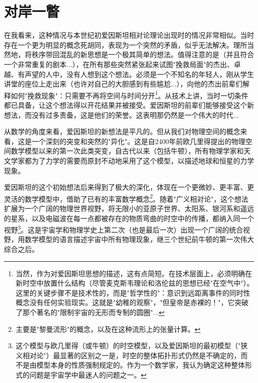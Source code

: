 \section{对岸一瞥}

在我看来，这种情况与本世纪初爱因斯坦相对论理论出现时的情况非常相似。当时存在一个更为明显的概念死胡同，表现为一个突然的矛盾，似乎无法解决。理所当然地，将秩序带回混乱的新思想是一个极其简单的想法。值得注意的是（并且符合一个非常重复的剧本...），在所有那些突然紧张起来试图"挽救局面"的杰出、卓越、有声望的人中，没有人想到这个想法。必须是一个不知名的年轻人，刚从学生讲堂的座位上走出来（也许对自己的大胆感到有些尴尬...），向他的杰出前辈们解释如何"挽救现象"：只需要不再将空间与时间分开\footnote{当然，作为对爱因斯坦思想的描述，这有点简短。在技术层面上，必须明确在新时空中放置什么结构（尽管麦克斯韦理论和洛伦兹的思想已经"在空气中"）。这里的关键步骤不是技术性的，而是"哲学性的"：意识到远距离事件的同时性概念没有任何实验现实。这就是"幼稚的观察"，"但皇帝是赤裸的！"，它突破了那个著名的"限制宇宙的无形而专制的圆圈"...}。从技术上讲，当时一切条件都已具备，让这个想法得以开花结果并被接受。爱因斯坦的前辈们能够接受这个新想法，而没有过多责备，这是他们的荣誉。这表明那仍然是一个伟大的时代...

从数学的角度来看，爱因斯坦的新想法是平凡的。但从我们对物理空间的概念来看，这是一个深刻的突变和突然的"异化"。这是自2400年前欧几里得提出的物理空间数学模型以来的第一次此类突变，自古代以来（包括牛顿），所有物理学家和天文学家都为了力学的需要而原封不动地采用了这个模型，以描述地球和恒星的力学现象。

爱因斯坦的这个初始想法后来得到了极大的深化，体现在一个更微妙、更丰富、更灵活的数学模型中，借助了已有的丰富数学概念\footnote{主要是"黎曼流形"的概念，以及在这种流形上的张量计算。}。随着"广义相对论"，这个想法扩展为一个广阔的物理世界视野，将无限小的亚原子世界、太阳系、银河系和遥远的星系，以及电磁波在每一点都被存在的物质弯曲的时空中的传播，都纳入同一个视野\footnote{这个模型与欧几里得（或牛顿）的时空模型，以及爱因斯坦的最初模型（"狭义相对论"）最显著的区别之一是，时空的整体拓扑形式仍然是不确定的，而不是由模型本身的性质强制规定的。作为一个数学家，我认为确定这种整体形式的问题是宇宙学中最迷人的问题之一。}。这是宇宙学和物理学史上第二次（也是最后一次）出现一个广阔的统合视野，用数学模型的语言描述宇宙中所有物理现象，继三个世纪前牛顿的第一次伟大综合之后。

